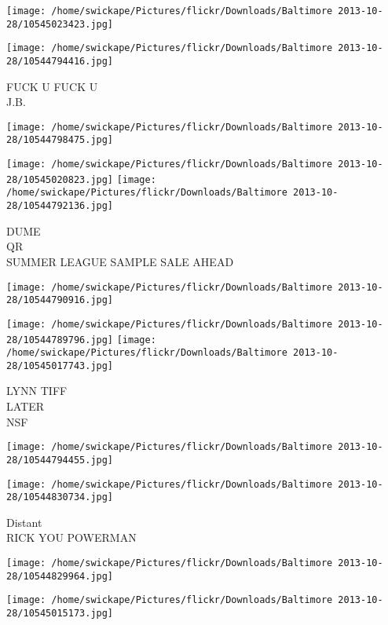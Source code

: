 \documentclass[10pt,letterpaper]{article}
\begin{document}
\texttt{[image: /home/swickape/Pictures/flickr/Downloads/Baltimore 2013-10-28/10545023423.jpg]}

\vspace{0.25in}
\texttt{[image: /home/swickape/Pictures/flickr/Downloads/Baltimore 2013-10-28/10544794416.jpg]}

FUCK U FUCK U\\
J.B.
\pagebreak

\texttt{[image: /home/swickape/Pictures/flickr/Downloads/Baltimore 2013-10-28/10544798475.jpg]}

\vspace{0.25in}
\texttt{[image: /home/swickape/Pictures/flickr/Downloads/Baltimore 2013-10-28/10545020823.jpg]}
\texttt{[image: /home/swickape/Pictures/flickr/Downloads/Baltimore 2013-10-28/10544792136.jpg]}

DUME\\
QR\\
SUMMER LEAGUE SAMPLE SALE AHEAD
\pagebreak

\texttt{[image: /home/swickape/Pictures/flickr/Downloads/Baltimore 2013-10-28/10544790916.jpg]}

\vspace{0.25in}
\texttt{[image: /home/swickape/Pictures/flickr/Downloads/Baltimore 2013-10-28/10544789796.jpg]}
\texttt{[image: /home/swickape/Pictures/flickr/Downloads/Baltimore 2013-10-28/10545017743.jpg]}

LYNN TIFF\\
LATER\\
NSF
\pagebreak

\texttt{[image: /home/swickape/Pictures/flickr/Downloads/Baltimore 2013-10-28/10544794455.jpg]}

\vspace{0.25in}
\texttt{[image: /home/swickape/Pictures/flickr/Downloads/Baltimore 2013-10-28/10544830734.jpg]}

Distant\\
RICK YOU POWERMAN
\pagebreak

\texttt{[image: /home/swickape/Pictures/flickr/Downloads/Baltimore 2013-10-28/10544829964.jpg]}

\vspace{0.25in}
\texttt{[image: /home/swickape/Pictures/flickr/Downloads/Baltimore 2013-10-28/10545015173.jpg]}
\end{document}
